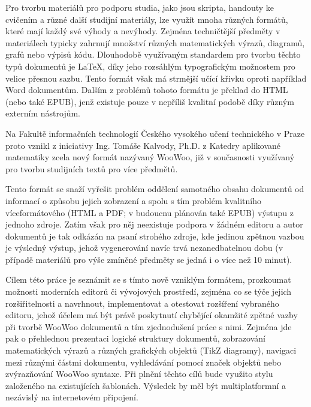 Pro tvorbu materiálů pro podporu studia, jako jsou skripta, handouty ke cvičením a různé další studijní materiály, lze
využít mnoha různých formátů, které mají každý své výhody a nevýhody. Zejména techničtější předměty v materiálech
typicky zahrnují množství různých matematických výrazů, diagramů, grafů nebo výpisů kódu. Dlouhodobě využívaným
standardem pro tvorbu těchto typů dokumentů je \LaTeX{}, díky jeho rozsáhlým typografickým možnostem pro velice přesnou
sazbu. Tento formát však má strmější učící křivku oproti například Word dokumentům. Dalším z problémů tohoto formátu je
překlad do HTML (nebo také EPUB), jenž existuje pouze v nepříliš kvalitní podobě díky různým externím nástrojům.

Na Fakultě informačních technologií Českého vysokého učení technického v Praze proto vznikl z iniciativy Ing. Tomáše
Kalvody, Ph.D. z Katedry aplikované matematiky zcela nový formát nazývaný WooWoo, již v současnosti využívaný pro tvorbu
studijních textů pro více předmětů.

Tento formát se snaží vyřešit problém oddělení samotného obsahu dokumentů od informací o způsobu jejich zobrazení a
spolu s tím problém kvalitního víceformátového (HTML a PDF; v budoucnu plánován také EPUB) výstupu z jednoho zdroje.
Zatím však pro něj neexistuje podpora v žádném editoru a autor dokumentů je tak odkázán na psaní strohého zdroje, kde
jedinou zpětnou vazbou je výsledný výstup, jehož vygenerování navíc trvá nezanedbatelnou dobu (v případě materiálů pro
výše zmíněné předměty se jedná i o více než 10 minut).

Cílem této práce je seznámit se s tímto nově vzniklým formátem, prozkoumat možnosti moderních editorů či vývojových
prostředí, zejména co se týče jejich rozšiřitelnosti a navrhnout, implementovat a otestovat rozšíření vybraného editoru,
jehož účelem má být právě poskytnutí chybějící okamžité zpětné vazby při tvorbě WooWoo dokumentů a tím zjednodušení
práce s nimi. Zejména jde pak o přehlednou prezentaci logické struktury dokumentů, zobrazování matematických výrazů a
různých grafických objektů (TikZ diagramy), navigaci mezi různými částmi dokumentu, vyhledávání pomocí značek objektů
nebo zvýrazňování WooWoo syntaxe. Při plnění těchto cílů bude využito stylu založeného na existujících šablonách.
Výsledek by měl být multiplatformní a nezávislý na internetovém připojení.
